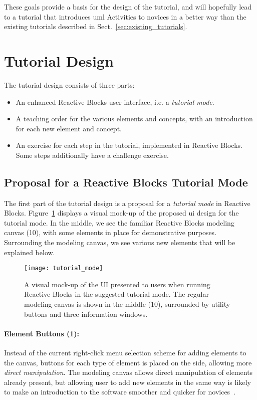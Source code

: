 \noindent
These goals provide a basis for the design of the tutorial, and will hopefully lead to a tutorial that introduces \gls{uml} Activities to novices in a better way than the existing tutorials described in Sect.~\ref{sec:existing_tutorials}.

\section{Tutorial Design}
\label{sec:tutorial_design}
The tutorial design consists of three parts:

\begin{itemize}
	\item An enhanced Reactive Blocks user interface, i.e. a \emph{tutorial mode}.
	\item A teaching order for the various elements and concepts, with an introduction for each new element and concept.
	\item An exercise for each step in the tutorial, implemented in Reactive Blocks. Some steps additionally have a challenge exercise.
\end{itemize}

\subsection{Proposal for a Reactive Blocks Tutorial Mode}
\label{sec:reactive_blocks_tutorial_mode}
The first part of the tutorial design is a proposal for a \emph{tutorial mode} in Reactive Blocks. Figure~\ref{fig:tutorial_mode} displays a visual mock-up of the proposed \gls{ui} design for the tutorial mode. In the middle, we see the familiar Reactive Blocks modeling canvas (10), with some elements in place for demonstrative purposes. Surrounding the modeling canvas, we see various new elements that will be explained below.

\begin{figure}[htp]
	\centering
	\texttt{[image: tutorial\_mode]}
	\caption[Reactive Blocks tutorial mode design]{A visual mock-up of the UI presented to users when running Reactive Blocks in the suggested tutorial mode. The regular modeling canvas is shown in the middle (10), surrounded by utility buttons and three information windows.}
	\label{fig:tutorial_mode}
\end{figure}

\paragraph{Element Buttons (1):} Instead of the current right-click menu selection scheme for adding elements to the canvas, buttons for each type of element is placed on the side, allowing more \emph{direct manipulation}. The modeling canvas allows direct manipulation of elements already present, but allowing user to add new elements in the same way is likely to make an introduction to the software smoother and quicker for novices~\cite{shneiderman:user_interface}.

